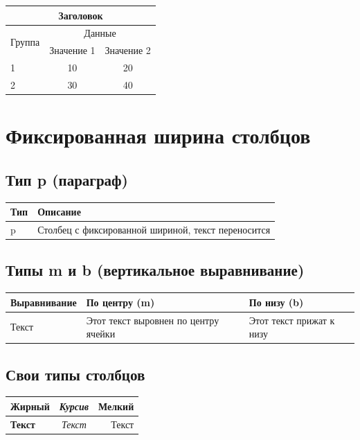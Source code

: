 \documentclass[a4paper,12pt]{article}
\begin{document}
\begin{tabular}{|l|c|c|}
  \hline
  \multicolumn{3}{|c|}{Заголовок} \\
  \hline
  \multirow{2}{*}{Группа} & \multicolumn{2}{c|}{Данные} \\
  \cline{2-3}
  & Значение 1 & Значение 2 \\
  \hline
  1 & 10 & 20 \\
  2 & 30 & 40 \\
  \hline
\end{tabular}

\section{Фиксированная ширина столбцов}

\subsection{Тип p (параграф)}

\begin{tabular}{|l|p{4cm}|}
  \hline
  Тип & Описание \\
  \hline
  p & Столбец с фиксированной шириной, текст переносится \\
  \hline
\end{tabular}

\subsection{Типы m и b (вертикальное выравнивание)}

\begin{tabular}{|l|m{3cm}|b{3cm}|}
  \hline
  Выравнивание & По центру (m) & По низу (b) \\
  \hline
  Текст & Этот текст выровнен по центру ячейки & Этот текст прижат к низу \\
  \hline
\end{tabular}

\subsection{Свои типы столбцов}

\begin{tabular}{|>{\bfseries}l|>{\itshape}c|>{\small}r|}
  \hline
  Жирный & Курсив & Мелкий \\
  \hline
  Текст & Текст & Текст \\
  \hline
\end{tabular}
\end{document}
